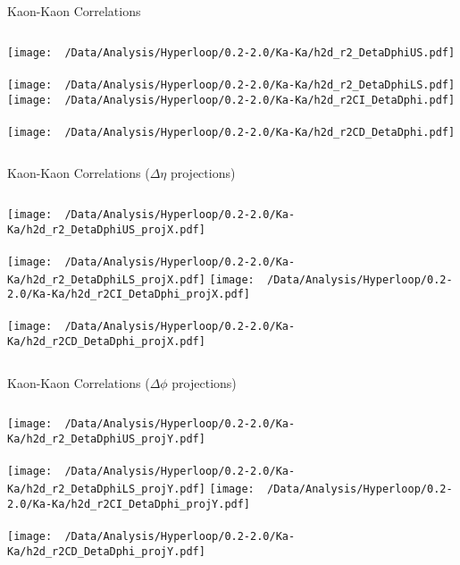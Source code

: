 \documentclass{beamer}
\begin{document}
\begin{frame}{Kaon-Kaon Correlations}
	\begin{columns}
		\centering
		\texttt{[image: ~/Data/Analysis/Hyperloop/0.2-2.0/Ka-Ka/h2d\_r2\_DetaDphiUS.pdf]}\\~\\
		\texttt{[image: ~/Data/Analysis/Hyperloop/0.2-2.0/Ka-Ka/h2d\_r2\_DetaDphiLS.pdf]}
		\centering
		\texttt{[image: ~/Data/Analysis/Hyperloop/0.2-2.0/Ka-Ka/h2d\_r2CI\_DetaDphi.pdf]}\\~\\
		\texttt{[image: ~/Data/Analysis/Hyperloop/0.2-2.0/Ka-Ka/h2d\_r2CD\_DetaDphi.pdf]}
	\end{columns}
\end{frame}
\begin{frame}{Kaon-Kaon Correlations ($\Delta\eta$ projections)}
	\begin{columns}
		\column{0.5\linewidth}
		\centering
		\texttt{[image: ~/Data/Analysis/Hyperloop/0.2-2.0/Ka-Ka/h2d\_r2\_DetaDphiUS\_projX.pdf]}\\~\\
		\texttt{[image: ~/Data/Analysis/Hyperloop/0.2-2.0/Ka-Ka/h2d\_r2\_DetaDphiLS\_projX.pdf]}
		\column{0.5\linewidth}
		\centering
		\texttt{[image: ~/Data/Analysis/Hyperloop/0.2-2.0/Ka-Ka/h2d\_r2CI\_DetaDphi\_projX.pdf]}\\~\\
		\texttt{[image: ~/Data/Analysis/Hyperloop/0.2-2.0/Ka-Ka/h2d\_r2CD\_DetaDphi\_projX.pdf]}
	\end{columns}
\end{frame}
\begin{frame}{Kaon-Kaon Correlations ($\Delta\phi$ projections)}
	\begin{columns}
		\centering
		\texttt{[image: ~/Data/Analysis/Hyperloop/0.2-2.0/Ka-Ka/h2d\_r2\_DetaDphiUS\_projY.pdf]}\\~\\
		\texttt{[image: ~/Data/Analysis/Hyperloop/0.2-2.0/Ka-Ka/h2d\_r2\_DetaDphiLS\_projY.pdf]}
		\centering
		\texttt{[image: ~/Data/Analysis/Hyperloop/0.2-2.0/Ka-Ka/h2d\_r2CI\_DetaDphi\_projY.pdf]}\\~\\
		\texttt{[image: ~/Data/Analysis/Hyperloop/0.2-2.0/Ka-Ka/h2d\_r2CD\_DetaDphi\_projY.pdf]}
	\end{columns}
\end{frame}
\end{document}
